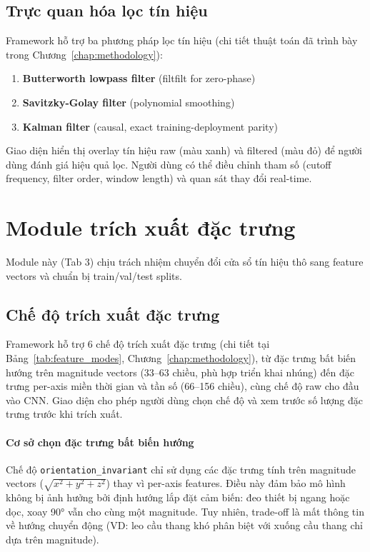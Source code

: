 \subsection{Trực quan hóa lọc tín hiệu}
\label{subsec:signal_filtering_viz}

Framework hỗ trợ ba phương pháp lọc tín hiệu (chi tiết thuật toán đã trình bày trong Chương~\ref{chap:methodology}):
\begin{enumerate}
    \item \textbf{Butterworth lowpass filter} (filtfilt for zero-phase)
    \item \textbf{Savitzky-Golay filter} (polynomial smoothing)
    \item \textbf{Kalman filter} (causal, exact training-deployment parity)
\end{enumerate}

Giao diện hiển thị overlay tín hiệu raw (màu xanh) và filtered (màu đỏ) để người dùng đánh giá hiệu quả lọc. Người dùng có thể điều chỉnh tham số (cutoff frequency, filter order, window length) và quan sát thay đổi real-time.

\section{Module trích xuất đặc trưng}
\label{sec:feature_engineering_module}

Module này (Tab 3) chịu trách nhiệm chuyển đổi cửa sổ tín hiệu thô sang feature vectors và chuẩn bị train/val/test splits.

\subsection{Chế độ trích xuất đặc trưng}
\label{subsec:feature_extraction_modes}

Framework hỗ trợ 6 chế độ trích xuất đặc trưng (chi tiết tại Bảng~\ref{tab:feature_modes}, Chương~\ref{chap:methodology}), từ đặc trưng bất biến hướng trên magnitude vectors (33--63 chiều, phù hợp triển khai nhúng) đến đặc trưng per-axis miền thời gian và tần số (66--156 chiều), cùng chế độ raw cho đầu vào CNN. Giao diện cho phép người dùng chọn chế độ và xem trước số lượng đặc trưng trước khi trích xuất.

\paragraph{Cơ sở chọn đặc trưng bất biến hướng}
Chế độ \texttt{orientation\_invariant} chỉ sử dụng các đặc trưng tính trên magnitude vectors ($\sqrt{x^2+y^2+z^2}$) thay vì per-axis features. Điều này đảm bảo mô hình không bị ảnh hưởng bởi định hướng lắp đặt cảm biến: đeo thiết bị ngang hoặc dọc, xoay 90° vẫn cho cùng một magnitude. Tuy nhiên, trade-off là mất thông tin về hướng chuyển động (VD: leo cầu thang khó phân biệt với xuống cầu thang chỉ dựa trên magnitude).

